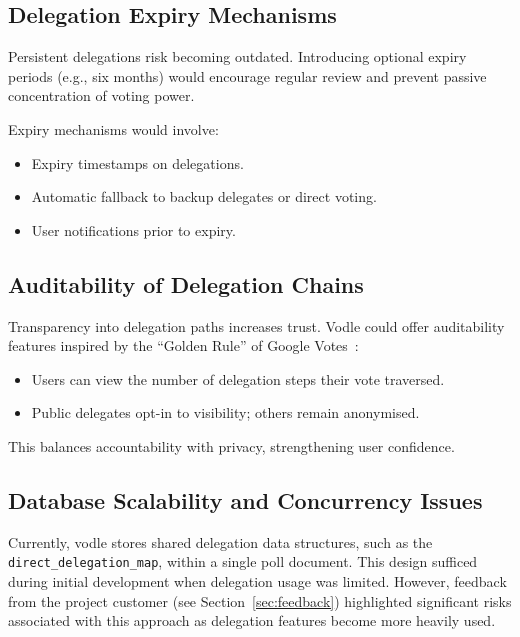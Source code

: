 \subsection{Delegation Expiry Mechanisms}

Persistent delegations risk becoming outdated. Introducing optional expiry periods (e.g., six months) would encourage regular review and prevent passive concentration of voting power.

Expiry mechanisms would involve:

\begin{itemize}
    \item Expiry timestamps on delegations.
    \item Automatic fallback to backup delegates or direct voting.
    \item User notifications prior to expiry.
\end{itemize}

\subsection{Auditability of Delegation Chains}

Transparency into delegation paths increases trust. Vodle could offer auditability features inspired by the ``Golden Rule'' of Google Votes~\citep{hardt_google_2015}:

\begin{itemize}
    \item Users can view the number of delegation steps their vote traversed.
    \item Public delegates opt-in to visibility; others remain anonymised.
\end{itemize}

This balances accountability with privacy, strengthening user confidence.

\subsection{Database Scalability and Concurrency Issues}

Currently, vodle stores shared delegation data structures, such as the \texttt{direct\_delegation\_map}, within a single poll document. This design sufficed during initial development when delegation usage was limited. However, feedback from the project customer (see Section~\ref{sec:feedback}) highlighted significant risks associated with this approach as delegation features become more heavily used.

